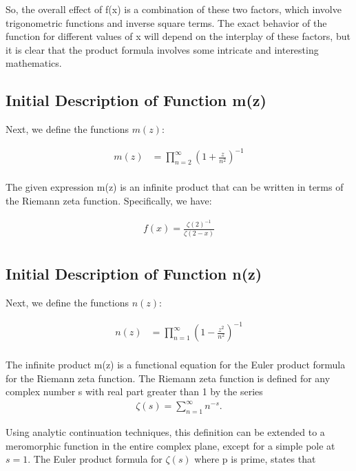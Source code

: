 \documentclass{article}
\begin{document}
So, the overall effect of f(x) is a combination of these two factors, which involve trigonometric functions and inverse square terms. The exact behavior of the function for different values of x will depend on the interplay of these factors, but it is clear that the product formula involves some intricate and interesting mathematics. \\

\newpage
\subsection*{Initial Description of Function m(z)}
Next, we define the functions $m(z)$:

\begin{align*}
m(z) &= \prod_{n=2}^\infty \left(1 + \frac{z}{n^2}\right)^{-1} \\
\end{align*}

The given expression m(z) is an infinite product that can be written in terms of the Riemann zeta function. Specifically, we have:

\begin{align*}
f(x) = \frac{\zeta\left(2\right)^{-1}}{\zeta\left(2-x\right)} \\
\end{align*}

\newpage
\subsection*{Initial Description of Function n(z)}
Next, we define the functions $n(z)$:

\begin{align*}
n(z) &= \prod_{n=1}^\infty \left(1 - \frac{z^2}{n^2}\right)^{-1} \\
\end{align*}

The infinite product m(z) is a functional equation for the Euler product formula for the Riemann zeta function. The Riemann zeta function is defined for any complex number s with real part greater than 1 by the series \\

\begin{align*}
\zeta(s) = \sum_{n=1}^\infty n^{-s}.
\end{align*}

Using analytic continuation techniques, this definition can be extended to a meromorphic function in the entire complex plane, except for a simple pole at $s=1$. The Euler product formula for $\zeta\left(s\right)$ where p is prime, states that \\
\end{document}
